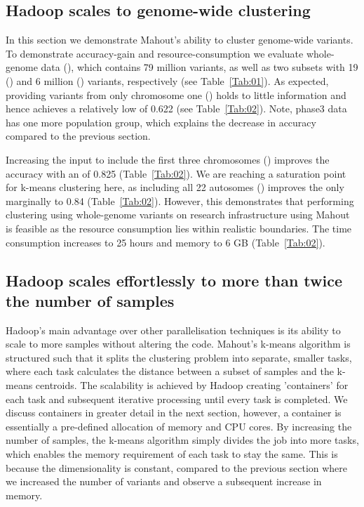 \documentclass{bioinfo}
\begin{document}
\subsection*{Hadoop scales to genome-wide clustering}
In this section we demonstrate Mahout's ability to cluster genome-wide variants. 
To demonstrate accuracy-gain and resource-consumption we evaluate whole-genome data (\FullPhasethree{}), which contains 79 million variants, as well as two subsets with 19 (\ThreePhasethree{}) and 6 million (\OnePhasethree{}) variants, respectively  (see Table~\ref{Tab:01}).  
As expected, providing variants from only chromosome one (\OnePhasethree{}) holds to little information and hence achieves a relatively low \ARI{} of 0.622 (see Table~\ref{Tab:02}).
Note, phase3 data has one more population group, which explains the decrease in accuracy compared to the previous section.  

Increasing the input to include the first three chromosomes (\ThreePhasethree{}) improves the accuracy with an \ARI{} of 0.825 (Table~\ref{Tab:02}).
We are reaching a saturation point for k-means clustering here, as including all 22 autosomes (\FullPhasethree{}) improves the \ARI{} only marginally to 0.84 (Table~\ref{Tab:02}).
However, this demonstrates that performing clustering using whole-genome variants on research infrastructure using Mahout is feasible as the resource consumption lies within realistic boundaries. 
The time consumption increases to 25 hours and memory to 6 GB (Table~\ref{Tab:02}). 


\subsection*{Hadoop scales effortlessly to more than twice the number of samples}
Hadoop's main advantage over other parallelisation techniques is its ability to scale to more samples without altering the code. 
Mahout's k-means algorithm is structured such that it splits the clustering problem into separate, smaller tasks, where each task calculates the distance between a subset of samples and the k-means centroids. 
The scalability is achieved by Hadoop creating 'containers' for each task and subsequent iterative processing until every task is completed.
We discuss containers in greater detail in the next section, however, a container is essentially a pre-defined allocation of memory and CPU cores.
By increasing the number of samples, the k-means algorithm simply divides the job into more tasks, which enables the memory requirement of each task to stay the same.
This is because the dimensionality is constant, compared to the previous section where we increased the number of variants and observe a subsequent increase in memory. 
\end{document}
